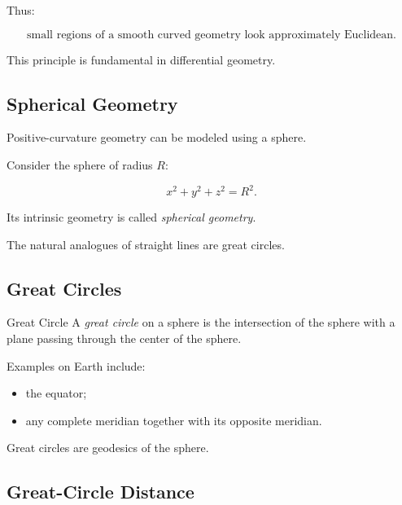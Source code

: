 Thus:

\[
\boxed{
\text{small regions of a smooth curved geometry look approximately
Euclidean.}
}
\]

This principle is fundamental in differential geometry.

\subsection{Spherical Geometry}
\label{subsec:spherical-geometry}

Positive-curvature geometry can be modeled using a sphere.

Consider the sphere of radius \(R\):

\[
\boxed{
x^2+y^2+z^2=R^2.
}
\]

Its intrinsic geometry is called \emph{spherical geometry}.

The natural analogues of straight lines are great circles.

\subsection{Great Circles}
\label{subsec:great-circles}

\begin{definitionbox}{Great Circle}
A \emph{great circle} on a sphere is the intersection of the sphere with a
plane passing through the center of the sphere.
\end{definitionbox}

Examples on Earth include:

\begin{itemize}
    \item the equator;
    \item any complete meridian together with its opposite meridian.
\end{itemize}

Great circles are geodesics of the sphere.

\subsection{Great-Circle Distance}
\label{subsec:great-circle-distance}


